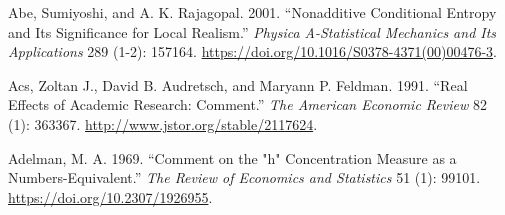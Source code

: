 \documentclass[
]{article}
\newlength{\cslhangindent}
\newenvironment{CSLReferences}[2] %
 {\begin{list}{}{%
  \setlength{\itemindent}{0pt}
  \setlength{\leftmargin}{0pt}
  \setlength{\parsep}{0pt}
  \ifodd #1
   \setlength{\leftmargin}{\cslhangindent}
   \setlength{\itemindent}{-1\cslhangindent}
  \fi
  \setlength{\itemsep}{#2\baselineskip}}}
 {\end{list}}
\begin{document}
\label{refs}
\begin{CSLReferences}{1}{0}
Abe, Sumiyoshi, and A. K. Rajagopal. 2001. {``Nonadditive Conditional Entropy and Its Significance for Local Realism.''} \emph{Physica A-Statistical Mechanics and Its Applications} 289 (1-2): 157164. \url{https://doi.org/10.1016/S0378-4371(00)00476-3}.

Acs, Zoltan J., David B. Audretsch, and Maryann P. Feldman. 1991. {``Real Effects of Academic Research: Comment.''} \emph{The American Economic Review} 82 (1): 363367. \url{http://www.jstor.org/stable/2117624}.

Adelman, M. A. 1969. {``Comment on the {"}h{"} Concentration Measure as a Numbers-Equivalent.''} \emph{The Review of Economics and Statistics} 51 (1): 99101. \url{https://doi.org/10.2307/1926955}.

\end{CSLReferences}
\end{document}
